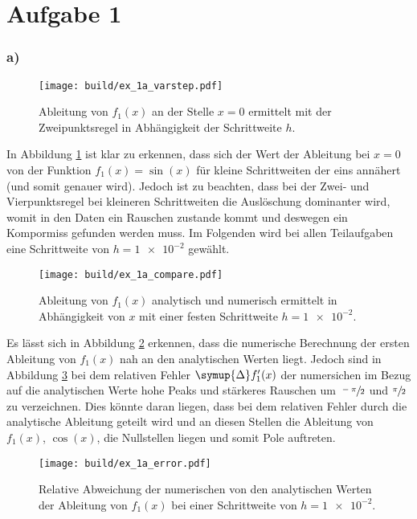 \section*{Aufgabe 1}
\subsubsection*{a)}
\begin{figure}
    \centering
    \texttt{[image: build/ex\_1a\_varstep.pdf]}
    \caption{Ableitung von $f_1(x)$ an der Stelle $x=0$ ermittelt mit der Zweipunktsregel
    in Abhängigkeit der Schrittweite $h$.}
    \label{fig:h_dep}
\end{figure}
\noindent
In Abbildung \ref{fig:h_dep} ist klar zu erkennen, dass sich der Wert der Ableitung bei $x=0$
von der Funktion $f_1(x) = \sin(x)$ für kleine
Schrittweiten der eins annähert (und somit genauer wird).
Jedoch ist zu beachten, dass bei der Zwei- und Vierpunktsregel bei kleineren 
Schrittweiten die Auslöschung dominanter wird, womit in den Daten ein Rauschen zustande kommt 
und deswegen ein Kompormiss gefunden werden muss. 
Im Folgenden wird bei allen Teilaufgaben eine Schrittweite von $h = \num{1e-2}$ gewählt.
\begin{figure}
    \centering
    \texttt{[image: build/ex\_1a\_compare.pdf]}
    \caption{Ableitung von $f_1(x)$ analytisch und numerisch ermittelt in Abhängigkeit von 
    $x$ mit einer festen Schrittweite $h=\num{1e-2}$.}
    \label{fig:a_comp}
\end{figure}
Es lässt sich in Abbildung \ref{fig:a_comp} erkennen, dass die 
numerische Berechnung der ersten Ableitung von $f_1(x)$ nah an den 
analytischen Werten liegt. 
Jedoch sind in Abbildung \ref{fig:rel_a} bei dem relativen Fehler 
$\symup{\Delta} f^{\prime}_1(x)$ der numersichen im Bezug 
auf die analytischen Werte hohe Peaks und stärkeres Rauschen um $\sfrac{-\pi}{2}$ und $\sfrac{\pi}{2}$
zu verzeichnen. 
Dies könnte daran liegen, dass bei dem relativen Fehler durch 
die analytische Ableitung geteilt wird und an diesen Stellen 
die Ableitung von $f_1(x)$, $\cos(x)$, die Nullstellen liegen und 
somit Pole auftreten.
\begin{figure}
    \centering
    \texttt{[image: build/ex\_1a\_error.pdf]}
    \caption{Relative Abweichung der numerischen von den analytischen Werten der Ableitung von $f_1(x)$
    bei einer Schrittweite von $h=\num{1e-2}$.}
    \label{fig:rel_a}
\end{figure}
\FloatBarrier
